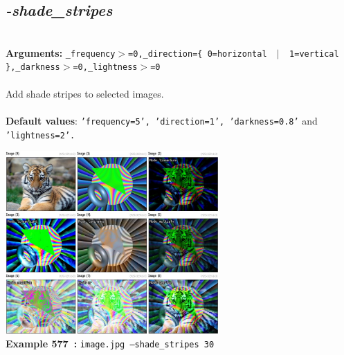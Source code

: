 \documentclass[a4paper,11pt,twoside]{book}
\begin{document}
\subsection{\emph{-shade\_stripes} }\vspace*{-0.5em}
~\\\textbf{Arguments: } 
{\small \texttt{\_frequency$>$=0,\_direction=\{ 0=horizontal ~$|$~ 1=vertical \},\_darkness$>$=0,\_lightness$>$=0}}\\~\\
Add shade stripes to selected images.
~\\~\\\textbf{Default values}: {\small \texttt{'frequency=5', 'direction=1', 'darkness=0.8'} and \texttt{'lightness=2'.}}
\begin{center}\includegraphics[keepaspectratio=true,height=7cm,width=\textwidth]{img/gmic_def577.jpg}\\
{\footnotesize \textbf{Example 577~:} \texttt{image.jpg --shade\_stripes 30}}
\end{center}
\end{document}
